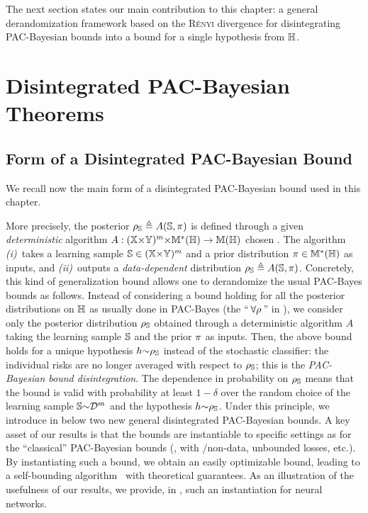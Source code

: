 The next section states our main contribution to this chapter: a general derandomization framework based on the \textsc{Rényi} divergence for disintegrating PAC-Bayesian bounds into a bound for a single hypothesis from $\H$.

\section{Disintegrated PAC-Bayesian Theorems}
\label{chap:dis-pra:sec:contrib}

\subsection{Form of a Disintegrated PAC-Bayesian Bound}

We recall now the main form of a disintegrated PAC-Bayesian bound used in this chapter.


More precisely, the posterior $\AQ \defeq A(\S, \P)$ is defined through a given \textit{deterministic} algorithm $A:(\X{\times}\Y)^{\m}{\times}\M^{*}(\H) \to \M(\H)$ chosen \apriori.
The algorithm {\it (i)}~takes a learning sample  $\S\in(\X{\times}\Y)^{\m}$ and a prior distribution $\P\in\M^{*}(\H)$ as inputs, and {\it (ii)}~outputs a {\it data-dependent} distribution $\AQ\defeq A(\S, \P)$.
Concretely, this kind of generalization bound allows one to derandomize the usual PAC-Bayes bounds as follows.
Instead of considering a bound holding for all the posterior distributions on $\H$ as usually done in PAC-Bayes (the ``$\,\forall \Q\,$'' in ), we consider only the posterior distribution $\AQ$ obtained through a deterministic algorithm $A$ taking the learning sample $\S$ and the prior $\P$ as inputs.
Then, the above bound holds for a unique hypothesis $\h{\sim}\AQ$ instead of the stochastic classifier: the individual risks are no longer averaged with respect to $\AQ$; this is the {\it PAC-Bayesian bound disintegration}.
The dependence in probability on $\AQ$ means that the bound is valid with probability at least $1{-}\delta$ over the random choice of the learning sample $\S{\sim}\D^\m$ and the hypothesis $\h{\sim}\AQ$.
Under this principle, we introduce in  below two new general disintegrated PAC-Bayesian bounds.
A key asset of our results is that the bounds are instantiable to specific settings  as for the ``classical'' PAC-Bayesian bounds (\eg, with \iid/non-\iid data, unbounded losses, etc.).
By instantiating such a bound, we obtain an easily optimizable bound, leading to a self-bounding algorithm~\citep{Freund1998} with theoretical guarantees.
As an illustration of the usefulness of our results, we provide, in , such an instantiation for neural networks.

